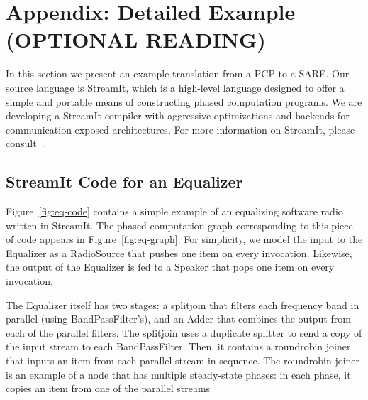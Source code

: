 \section{Appendix: Detailed Example (OPTIONAL READING)}

In this section we present an example translation from a PCP to a
SARE.  Our source language is StreamIt, which is a high-level language
designed to offer a simple and portable means of constructing phased
computation programs.  We are developing a StreamIt compiler with
aggressive optimizations and backends for communication-exposed
architectures.  For more information on StreamIt, please
consult~\cite{streamitcc,Gordo02}.

\subsection{StreamIt Code for an Equalizer}

Figure~\ref{fig:eq-code} contains a simple example of an equalizing
software radio written in StreamIt.  The phased computation graph
corresponding to this piece of code appears in
Figure~\ref{fig:eq-graph}.  For simplicity, we model the input to the
Equalizer as a RadioSource that pushes one item on every invocation.
Likewise, the output of the Equalizer is fed to a Speaker that pops
one item on every invocation.

The Equalizer itself has two stages: a splitjoin that filters each
frequency band in parallel (using BandPassFilter's), and an Adder that
combines the output from each of the parallel filters.  The splitjoin
uses a duplicate splitter to send a copy of the input stream to each
BandPassFilter.  Then, it contains a roundrobin joiner that inputs an
item from each parallel stream in sequence.  The roundrobin joiner is
an example of a node that has multiple steady-state phases: in each
phase, it copies an item from one of the parallel streams

